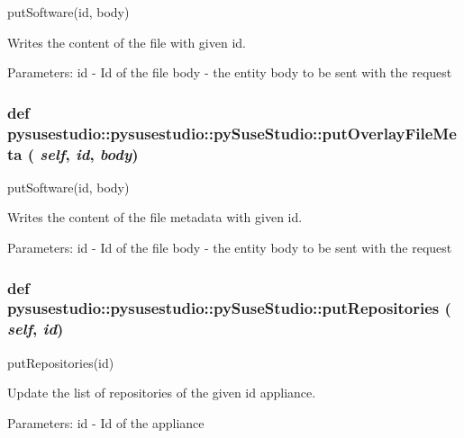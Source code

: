 \label{classpysusestudio_1_1pysusestudio_1_1py_suse_studio_ae639fded13dd70025daea866e3b240bf}
\begin{DoxyVerb}putSoftware(id, body)

        Writes the content of the file with given id.  
            
            Parameters:
id - Id of the file
body - the entity body to be sent with the request

\end{DoxyVerb}
 \hypertarget{classpysusestudio_1_1pysusestudio_1_1py_suse_studio_a60b6225261294e71787b68c1e6b199cf}{
\subsubsection[{putOverlayFileMeta}]{\setlength{\rightskip}{0pt plus 5cm}def pysusestudio::pysusestudio::pySuseStudio::putOverlayFileMeta ( {\em self}, \/   {\em id}, \/   {\em body})}}
\label{classpysusestudio_1_1pysusestudio_1_1py_suse_studio_a60b6225261294e71787b68c1e6b199cf}
\begin{DoxyVerb}putSoftware(id, body)

        Writes the content of the file metadata with given id.  
            
            Parameters:
id - Id of the file
body - the entity body to be sent with the request

\end{DoxyVerb}
 \hypertarget{classpysusestudio_1_1pysusestudio_1_1py_suse_studio_aefd1c29da651aea6fc377a9af04c9e6f}{
\subsubsection[{putRepositories}]{\setlength{\rightskip}{0pt plus 5cm}def pysusestudio::pysusestudio::pySuseStudio::putRepositories ( {\em self}, \/   {\em id})}}
\label{classpysusestudio_1_1pysusestudio_1_1py_suse_studio_aefd1c29da651aea6fc377a9af04c9e6f}
\begin{DoxyVerb}putRepositories(id)

        Update the list of repositories of the given id appliance.  
            
            Parameters:
id - Id of the appliance

\end{DoxyVerb}
